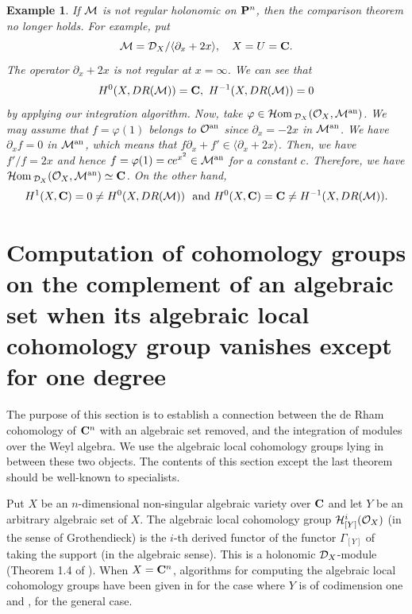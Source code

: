 \documentclass[12pt]{article}
\def\pd#1{ \partial_{#1} }
\def\C{{\bf C}}
\def\Hom{ {\cal H}{\rm om}\, }
\def\Dsc{ {\cal D} }
\def\Hsc{ {\cal H} }
\def\Msc{ {\cal M} }
\def\Osc{ {\cal O} }
\newtheorem{example}{Example}[section]
\begin{document}
\begin{example} \rm
If $\Msc$ is not regular holonomic on ${\bf P}^n$, then the comparison theorem
no longer holds.
For example, put
$$ \Msc = \Dsc_X/ \langle \pd{x}+ 2 x \rangle, \quad
   X = U = \C.$$
The operator
$\pd{x} + 2 x$ is not regular at $x=\infty$.
We can see that
$$H^0(X, DR(\Msc)) = \C, \ 
  H^{-1}(X, DR(\Msc)) = 0
$$
by applying our integration algorithm.
Now, take $\varphi \in \Hom_{\Dsc_X}(\Osc_X,\Msc^{\rm an})$.
We may assume that $f = \varphi(1)$ belongs to $\Osc^{\rm an}$ since
$\pd{x} = -2x$ in $\Msc^{\rm an}$.
We have  $\pd{x} f  = 0$ in $\Msc^{\rm an}$, which means that
$ f \pd{x} + f' \in \langle \pd{x} + 2 x \rangle$.
Then, we have $f'/f = 2x$ and hence 
$ f = \varphi(1) = c e^{x^2} \in \Msc^{\rm an}$
for a constant $c$.
Therefore, we have
$ \Hom_{\Dsc_X}(\Osc_X,\Msc^{\rm an}) \simeq \C$.
On the other hand,
$$ H^1(X,\C) = 0 \not= H^0(X,DR(\Msc)) \ \mbox{ and }
   H^0(X,\C) = \C \not= H^{-1}(X,DR(\Msc)).
$$  
\end{example}



\section{Computation of cohomology groups on the complement of an 
algebraic set when its algebraic local cohomology group vanishes
except for one degree}
\setcounter{equation}{0}
\label{section:acyclic}

The purpose of this section is to establish a connection between 
the de Rham cohomology of $\C^n$ with an algebraic set removed, 
and the integration of modules over the Weyl algebra.  
We use the algebraic local cohomology groups lying in between these two
objects.
The contents of this section except the last theorem
should be well-known to specialists.

Put $X$ be an $n$-dimensional non-singular algebraic variety over $\C$
and let $Y$ be an arbitrary algebraic set of $X$. 
The algebraic local cohomology group $\Hsc^i_{[Y]}(\Osc_X)$ 
(in the sense of Grothendieck) is the $i$-th derived functor of 
the functor $\Gamma_{[Y]}$ of taking the support (in the algebraic sense). 
This is a holonomic $\Dsc_X$-module (Theorem 1.4 of \cite{K1}). 
When $X = \C^n$, 
algorithms for computing the algebraic local cohomology groups 
have been given in \cite{OakuAdvance} 
for the case where $Y$ is of codimension one and \cite{Walther}, \cite{OakuAdvance2}
for the general case.  
\end{document}
